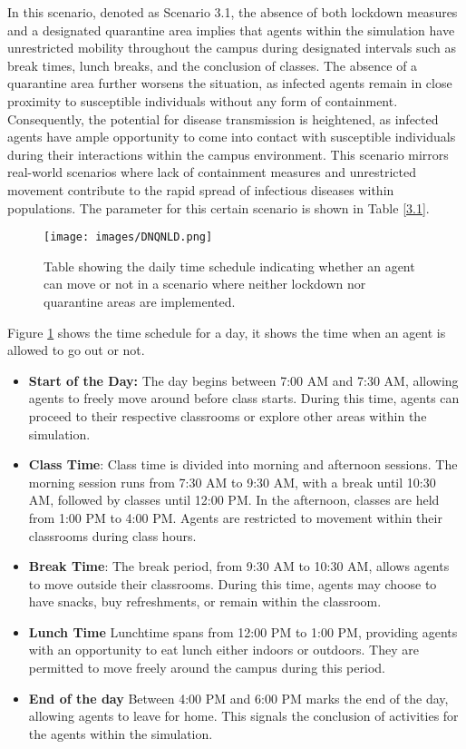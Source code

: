 	In this scenario, denoted as Scenario 3.1, the absence of both lockdown measures and a designated quarantine area implies that agents within the simulation have unrestricted mobility throughout the campus during designated intervals such as break times, lunch breaks, and the conclusion of classes. The absence of a quarantine area further worsens the situation, as infected agents remain in close proximity to susceptible individuals without any form of containment. Consequently, the potential for disease transmission is heightened, as infected agents have ample opportunity to come into contact with susceptible individuals during their interactions within the campus environment. This scenario mirrors real-world scenarios where lack of containment measures and unrestricted movement contribute to the rapid spread of infectious diseases within populations. The parameter for this certain scenario is shown in Table \ref{3.1}.
	
	\begin{figure}[H]
		\centering
		\texttt{[image: images/DNQNLD.png]}
		\caption{Table showing the daily time schedule indicating whether an agent can move or not in a scenario where neither lockdown nor quarantine areas are implemented.}
		\label{3.1a} 
	\end{figure}

Figure \ref{3.1a} shows the time schedule for a day, it shows the time when an agent is allowed to go out or not.

\begin{itemize}
\item \textbf{Start of the Day:} The day begins between 7:00 AM and 7:30 AM, allowing agents to freely move around before class starts. During this time, agents can proceed to their respective classrooms or explore other areas within the simulation.

\item \textbf{Class Time}: Class time is divided into morning and afternoon sessions. The morning session runs from 7:30 AM to 9:30 AM, with a break until 10:30 AM, followed by classes until 12:00 PM. In the afternoon, classes are held from 1:00 PM to 4:00 PM. Agents are restricted to movement within their classrooms during class hours.

\item \textbf{Break Time}: The break period, from 9:30 AM to 10:30 AM, allows agents to move outside their classrooms. During this time, agents may choose to have snacks, buy refreshments, or remain within the classroom.

\item \textbf{Lunch Time} Lunchtime spans from 12:00 PM to 1:00 PM, providing agents with an opportunity to eat lunch either indoors or outdoors. They are permitted to move freely around the campus during this period.

\item \textbf{End of the day} Between 4:00 PM and 6:00 PM marks the end of the day, allowing agents to leave for home. This signals the conclusion of activities for the agents within the simulation.
\end{itemize}

